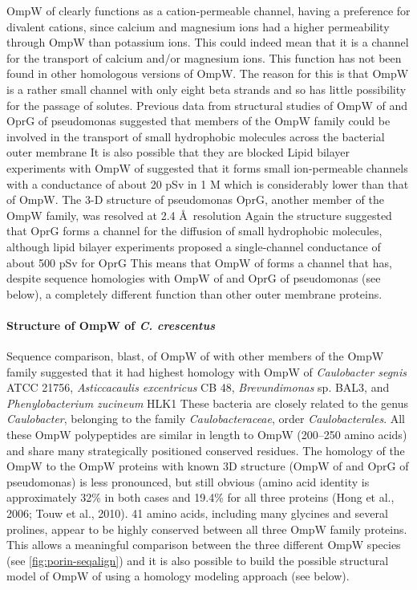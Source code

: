 OmpW of \caulobacter clearly functions as a cation-permeable channel, having a
preference for divalent cations, since calcium and magnesium ions had a higher
permeability through OmpW than potassium ions. This could indeed mean that it is
a channel for the transport of calcium and/or magnesium ions. This function has
not been found in other homologous versions of OmpW. The reason for this is that OmpW is a rather small channel with only eight beta strands and so has little possibility for the passage of solutes. Previous data from structural studies of OmpW of \ecoli and OprG of \ac{pseudomonas} suggested that members of the OmpW family could be involved in the transport of small hydrophobic molecules across the bacterial outer membrane It is also possible that they are blocked Lipid bilayer experiments with OmpW of \ecoli suggested that it forms small ion-permeable channels with a conductance of about 20 \si{\pico\sievert} in 1 M  which is considerably lower than that of \caulobacter OmpW. The 3-D structure of \ac{pseudomonas} OprG, another member of the OmpW family, was resolved at 2.4 \AA~resolution Again the structure suggested that OprG forms a channel for the diffusion of small hydrophobic molecules, although lipid bilayer experiments proposed a single-channel conductance of about 500 \si{\pico\sievert} for OprG This means that OmpW of \caulobacter forms a channel that has, despite sequence homologies with OmpW of \ecoli and OprG of \ac{pseudomonas} (see below), a completely different function than other outer membrane proteins.

\paragraph{Structure of OmpW of \textit{C. crescentus}}\label{sub:structompw}
Sequence comparison, \ac{blast}, of OmpW of \caulobacter with other members of
the OmpW family suggested that it had highest homology with OmpW of
\textit{Caulobacter segnis} ATCC 21756, \textit{Asticcacaulis excentricus} CB
48, \textit{Brevundimonas} sp. BAL3, and \textit{Phenylobacterium zucineum}
HLK1 These bacteria are closely related to
the genus \textit{Caulobacter}, belonging to the family
\textit{Caulobacteraceae}, order \textit{Caulobacterales}. All these OmpW
polypeptides are similar in length to \caulobacter OmpW (200--250 amino acids)
and share many strategically positioned conserved residues. The homology of the
\caulobacter OmpW to the OmpW proteins with known 3D structure (OmpW of \ecoli
and OprG of \ac{pseudomonas}) is less pronounced, but still obvious (amino acid
identity is approximately 32\% in both cases and 19.4\% for all three proteins
(Hong et al., 2006; Touw et al., 2010). 41 amino acids, including many glycines
and several prolines, appear to be highly conserved between all three OmpW
family proteins. This allows a meaningful comparison between the three different
OmpW species (see \cref{fig:porin-seqalign}) and it is also possible to build
the possible structural model of OmpW of \caulobacter using a homology modeling approach (see below). 

